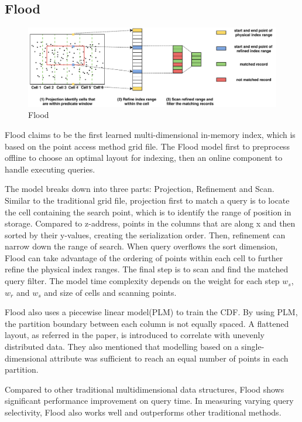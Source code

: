 \subsection{Flood}

\begin{figure}[ht]
\centering
\includegraphics[width=\textwidth]{Figures/flood.pdf}
\caption{Flood}
\label{fig:flood}
\end{figure}

Flood \cite{Nathan:2019wc} claims to be the first learned multi-dimensional in-memory index, which is based on the point access method grid file. The Flood model first to preprocess offline to choose an optimal layout for indexing, then an online component to handle executing queries. 

The model breaks down into three parts: Projection, Refinement and Scan. Similar to the traditional grid file, projection first to match a query is to locate the cell containing the search point, which is to identify the range of position in storage. Compared to z-address, points in the columns that are along x and then sorted by their y-values, creating the serialization order. Then, refinement can narrow down the range of search. When query overflows the sort dimension, Flood can take advantage of the ordering of points within each cell to further refine the physical index ranges. The final step is to scan and find the matched query filter. The model time complexity depends on the weight for each step $w_s$, $w_r$ and $w_s$ and size of cells and scanning points. 

Flood also uses a piecewise linear model(PLM) to train the CDF. By using PLM, the partition boundary between each column is not equally spaced. A flattened layout, as referred in the paper, is introduced to correlate with unevenly distributed data. They also mentioned that modelling based on a single-dimensional attribute was sufficient to reach an equal number of points in each partition. 

Compared to other traditional multidimensional data structures, Flood shows significant performance improvement on query time. In measuring varying query selectivity, Flood also works well and outperforms other traditional methods. 


